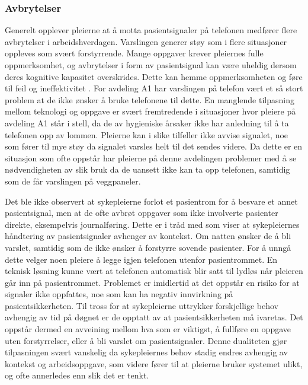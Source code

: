 \subsubsection{Avbrytelser}
Generelt opplever pleierne at å motta pasientsignaler på telefonen medfører flere avbrytelser i arbeidshverdagen. Varslingen generer støy som i flere situasjoner oppleves som svært forstyrrende. Mange oppgaver krever pleiernes fulle oppmerksomhet, og avbrytelser i form av pasientsignal kan være uheldig dersom deres kognitive kapasitet overskrides. Dette kan hemme oppmerksomheten og føre til feil og ineffektivitet \citep{Ebright10, Parker00}. For avdeling A1 har varslingen på telefon vært et så stort problem at de ikke ønsker å bruke telefonene til dette. En manglende tilpasning mellom teknologi og oppgave er svært fremtredende i situasjoner hvor pleiere på avdeling A1 står i stell, da de av hygieniske årsaker ikke har anledning til å ta telefonen opp av lommen. Pleierne kan i slike tilfeller ikke avvise signalet, noe som fører til mye støy da signalet varsles helt til det sendes videre. Da dette er en situasjon som ofte oppstår har pleierne på denne avdelingen problemer med å se nødvendigheten av slik bruk da de uansett ikke kan ta opp telefonen, samtidig som de får varslingen på veggpaneler.

\noindent
Det ble ikke observert at sykepleierne forlot et pasientrom for å besvare et annet pasientsignal, men at de ofte avbrøt oppgaver som ikke involverte pasienter direkte, eksempelvis journalføring. Dette er i tråd med \citet{klemets13} som viser at sykepleiernes håndtering av pasientsignaler avhenger av kontekst. Om natten ønsker de å bli varslet, samtidig som de ikke ønsker å forstyrre sovende pasienter. For å unngå dette velger noen pleiere å legge igjen telefonen utenfor pasientrommet. En teknisk løsning kunne vært at telefonen automatisk blir satt til lydløs når pleieren går inn på pasientrommet. Problemet er imidlertid at det oppstår en risiko for at signaler ikke oppfattes, noe som kan ha negativ innvirkning på pasientsikkerheten. Til tross for at sykepleierne uttrykker forskjellige behov avhengig av tid på døgnet er de opptatt av at pasientsikkerheten må ivaretas. Det oppstår dermed en avveining mellom hva som er viktigst, å fullføre en oppgave uten forstyrrelser, eller å bli varslet om pasientsignaler. Denne dualiteten gjør tilpasningen svært vanskelig da sykepleiernes behov stadig endres avhengig av kontekst og arbeidsoppgave, som videre fører til at pleierne bruker systemet ulikt, og ofte annerledes enn slik det er tenkt. 

